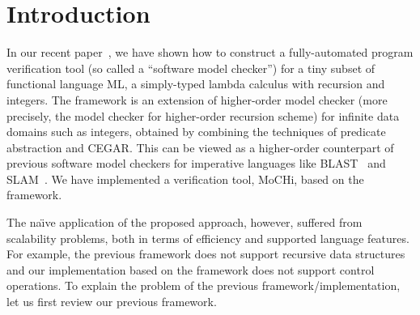 \vspace{-5pt}
\section{Introduction}
\label{sec:intro}

In our recent paper~\cite{KobayashiPLDI2011}, we have shown how to
construct a fully-automated program verification tool (so called a
``software model checker'') for a tiny subset of functional language ML, a
simply-typed lambda calculus with recursion and integers.
The framework is an extension of higher-order model checker
(more precisely, the model checker for higher-order recursion scheme)
for infinite data domains such as integers, obtained by
combining the techniques of
predicate abstraction and CEGAR.  This can be viewed as a higher-order
counterpart of previous software model checkers for imperative languages
like BLAST~\cite{Henzinger2002} and SLAM~\cite{Ball2002}.
We have implemented a verification tool, MoCHi, based on the framework.

The na\"{\i}ve application of the proposed approach, however, suffered
from scalability problems, both in terms of efficiency and supported
language features. For example, the previous framework does not support
recursive data structures and our implementation based on the framework
does not support control operations.  To explain the problem of the
previous framework/implementation, let us first review our previous
framework.

